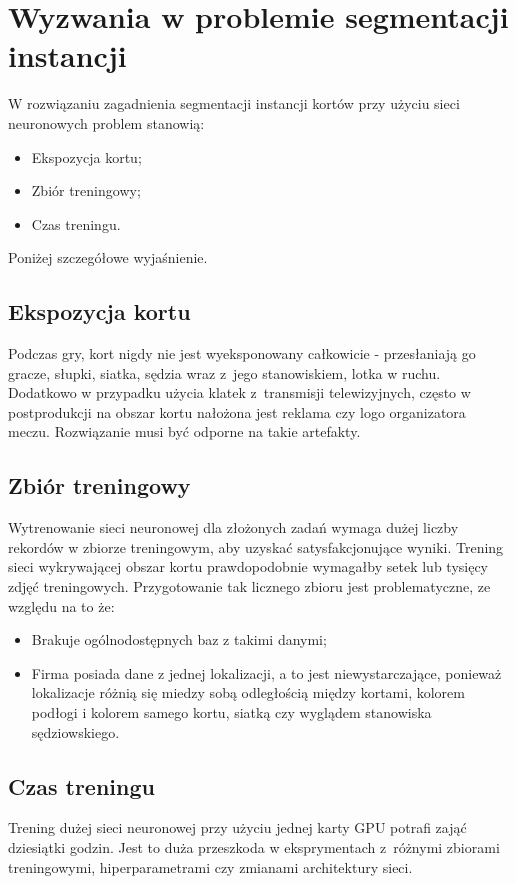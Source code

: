 \section{Wyzwania w problemie segmentacji instancji}

W rozwiązaniu zagadnienia segmentacji instancji kortów przy użyciu sieci neuronowych problem stanowią:

\begin{itemize}
  \item Ekspozycja kortu;
  \item Zbiór treningowy;
  \item Czas treningu.
\end{itemize}

Poniżej szczegółowe wyjaśnienie.

\subsection*{Ekspozycja kortu}

Podczas gry, kort nigdy nie jest wyeksponowany całkowicie - przesłaniają go gracze, słupki, siatka, sędzia wraz z~jego stanowiskiem, lotka w ruchu.
Dodatkowo w przypadku użycia klatek z~transmisji telewizyjnych, często w postprodukcji na obszar kortu nałożona jest reklama czy logo organizatora meczu.
Rozwiązanie musi być odporne na takie artefakty.

\subsection*{Zbiór treningowy}

Wytrenowanie sieci neuronowej dla złożonych zadań wymaga dużej liczby rekordów w zbiorze treningowym, aby uzyskać satysfakcjonujące wyniki.
Trening sieci wykrywającej obszar kortu prawdopodobnie wymagałby setek lub tysięcy zdjęć treningowych.
Przygotowanie tak licznego zbioru jest problematyczne, ze względu na to że:

\begin{itemize}
	\item Brakuje ogólnodostępnych baz z takimi danymi;
	\item Firma posiada dane z jednej lokalizacji, a to jest niewystarczające, ponieważ lokalizacje różnią się miedzy sobą odległością między kortami, kolorem podłogi i kolorem samego kortu, siatką czy wyglądem stanowiska sędziowskiego.
\end{itemize}

\subsection*{Czas treningu}

Trening dużej sieci neuronowej przy użyciu jednej karty GPU potrafi zająć dziesiątki godzin.
Jest to duża przeszkoda w eksprymentach z~różnymi zbiorami treningowymi, hiperparametrami czy zmianami architektury sieci.
